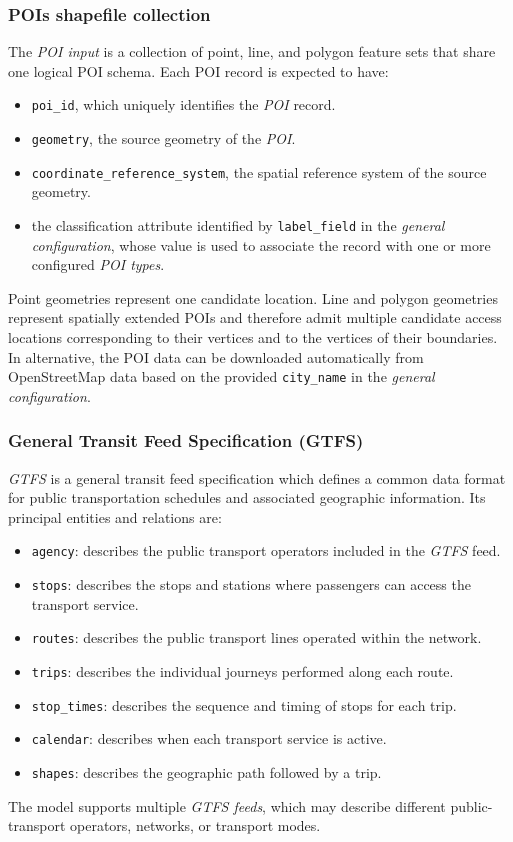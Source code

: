 \documentclass{article}
\begin{document}
\subsubsection*{POIs shapefile collection}
    The \emph{POI input} is a collection of point, line, and polygon feature sets that
    share one logical POI schema. Each POI record is expected to have:
    \begin{itemize}
        \item \texttt{poi\_id}, which uniquely identifies the \emph{POI} record.
        \item \texttt{geometry}, the source geometry of the \emph{POI}.
        \item \texttt{coordinate\_reference\_system}, the spatial reference system
        of the source geometry.
        \item the classification attribute identified by
        \texttt{label\_field} in the \emph{general configuration}, whose value is
        used to associate the record with one or more configured
        \emph{POI types}.
    \end{itemize}
    Point geometries represent one candidate location. Line and polygon geometries represent spatially extended POIs and therefore admit multiple candidate access locations corresponding to their vertices and to the vertices of their boundaries.
    In alternative, the POI data can be downloaded automatically from OpenStreetMap data based on the provided \texttt{city\_name} in the \emph{general configuration}.
    
\subsubsection*{General Transit Feed Specification (GTFS)}
\emph{GTFS} is a general transit feed specification which defines a common data format for public transportation schedules and associated geographic information. Its principal entities and relations are:
\begin{itemize}
    \item \texttt{agency}: describes the public transport operators included in the \emph{GTFS} feed.
    \item \texttt{stops}: describes the stops and stations where passengers can access the transport service.
    \item \texttt{routes}: describes the public transport lines operated within the network.
    \item \texttt{trips}: describes the individual journeys performed along each route.
    \item \texttt{stop\_times}: describes the sequence and timing of stops for each trip.
    \item \texttt{calendar}: describes when each transport service is active.
    \item \texttt{shapes}: describes the geographic path followed by a trip.
\end{itemize}
The model supports multiple \emph{GTFS feeds}, which may describe different
public-transport operators, networks, or transport modes.
\end{document}
